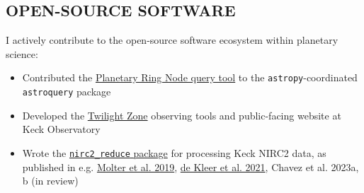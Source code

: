 \documentclass[margin, 10pt]{res} %
\begin{document}
\begin{resume}






\section{OPEN-SOURCE SOFTWARE}

I actively contribute to the open-source software ecosystem within planetary science:

\begin{itemize}

\item Contributed the \href{https://github.com/astropy/astroquery/tree/main/astroquery/solarsystem/pds}{Planetary Ring Node query tool} to the \texttt{astropy}-coordinated \texttt{astroquery} package

\item Developed the \href{https://www2.keck.hawaii.edu/inst/tda/TwilightZone.html#}{Twilight Zone} observing tools and public-facing website at Keck Observatory

\item Wrote the \href{https://github.com/emolter/nirc2_reduce}{\texttt{nirc2\_reduce} package} for processing Keck NIRC2 data, as published in e.g. \href{https://doi.org/10.1016/j.icarus.2018.11.018}{Molter et al. 2019}, \href{https://doi.org/10.3847/1538-3881/ab2380}{de Kleer et al. 2021}, Chavez et al. 2023a, b (in review)


\end{itemize}
\end{resume}
\end{document}
